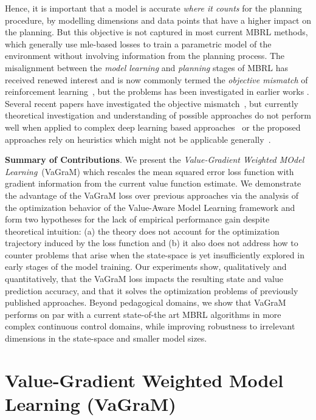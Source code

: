 Hence, it is important that a model is accurate \textit{where it counts} for the planning procedure, by modelling dimensions and data points that have a higher impact on the planning.
But this objective is not captured in most current MBRL methods, which generally use \ac{mle}-based losses to train a parametric model of the environment without involving information from the planning process.
The misalignment between the \emph{model learning} and \emph{planning} stages of MBRL has received renewed interest and is now commonly termed the \textit{objective mismatch} of reinforcement learning~\parencite{lambert202objective}, but the problems has been investigated in earlier works \parencite{joseph2013reinforcement}.
Several recent papers have investigated the objective mismatch~\parencite{abachi2020policy,zhang2021learning,AyoubJiaSzepesvariWang2020,grimm2020value,grimm2021proper,nikishin2021control}, but currently theoretical investigation and understanding of possible approaches do not perform well when applied to complex deep learning based approaches~\parencite{lovatto2020decision} or the proposed approaches rely on heuristics which might not be applicable generally~\parencite{nair2020goal}.

\noindent \textbf{Summary of Contributions}. We present the \textit{Value-Gradient Weighted MOdel Learning}~(VaGraM) which rescales the mean squared error loss function with gradient information from the current value function estimate.
We demonstrate the advantage of the VaGraM loss over previous approaches via the analysis of the optimization behavior of the Value-Aware Model Learning framework \parencite{vaml, itervaml} and form two hypotheses for the lack of empirical performance gain despite theoretical intuition: (a) the theory does not account for the optimization trajectory induced by the loss function and (b) it also does not address how to counter problems that arise when the state-space is yet insufficiently explored in early stages of the model training.
Our experiments show, qualitatively and quantitatively, that the VaGraM loss impacts the resulting state and value prediction accuracy, and that it solves the optimization problems of previously published approaches.
Beyond pedagogical domains, we show that VaGraM performs on par with a current state-of-the art MBRL algorithms in more complex continuous control domains, while improving robustness to irrelevant dimensions in the state-space and smaller model sizes.



\section{Value-Gradient Weighted Model Learning (VaGraM)}
\label{sec:method}

